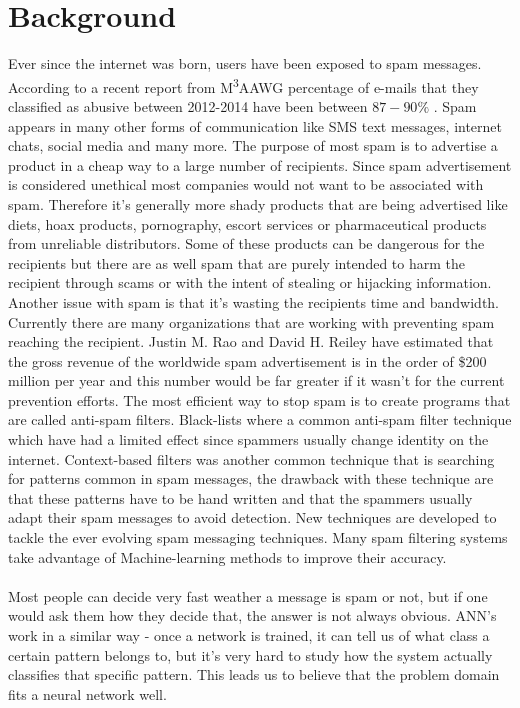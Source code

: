 
\section{Background}

Ever since the internet was born, users have been exposed to spam
messages. According to a recent report from M\textsuperscript{3}AAWG percentage
of e-mails that they classified as abusive between 2012-2014 have been between
$87-90\%$ \cite{M3AAWG2014}. Spam appears in many other forms of communication
like SMS text messages, internet chats, social media and many more.  The
purpose of most spam is to advertise a product in a cheap way to a large number
of recipients. Since spam advertisement is considered unethical most companies
would not want to be associated with spam.  Therefore it's generally more shady
products that are being advertised like diets, hoax products, pornography,
escort services or pharmaceutical products from unreliable distributors. Some
of these products can be dangerous for the recipients but there are as well
spam that are purely intended to harm the recipient through scams or with the
intent of stealing or hijacking information.  Another issue with spam is that 
it's wasting the recipients time and bandwidth. Currently there are many
organizations that are working with preventing spam reaching the recipient.
Justin M. Rao and David H. Reiley \cite{rao2012economics} have estimated that
the gross revenue of the worldwide spam advertisement is in the order of \$200
million per year and this number would be far greater if it wasn't for the
current prevention efforts. The most efficient way to stop spam is to create
programs that are called anti-spam filters. Black-lists where a common
anti-spam filter technique which have had a limited effect since spammers
usually change identity on the internet. Context-based filters was another
common technique that is searching for patterns common in spam messages, the
drawback with these technique are that these patterns have to be hand written
and that the spammers usually adapt their spam messages to avoid detection.
New techniques are developed to tackle the ever evolving spam messaging
techniques.\cite{spam-techniques} Many spam filtering systems take advantage of
Machine-learning methods to improve their accuracy. \\\\
Most people can decide very fast weather a message is spam or not, but if one
would ask them how they decide that, the answer is not always obvious. 
ANN's work in a similar way - once a network is trained, it can tell
us of what class a certain pattern belongs to, but it's very hard to study how
the system actually classifies that specific pattern. This leads us to believe
that the problem domain fits a neural network well. 
